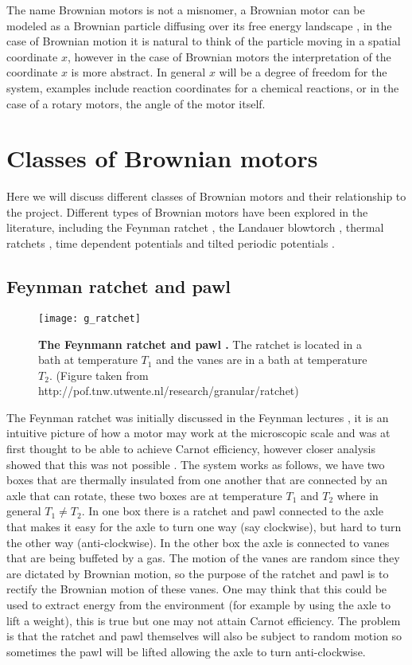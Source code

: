 The name Brownian motors is not a misnomer, a Brownian motor can be modeled as a Brownian particle diffusing over its free energy landscape \cite{Reimann2001}, in the case of Brownian motion it is natural to think of the particle moving in a spatial coordinate $x$, however in the case of Brownian motors the interpretation of the coordinate $x$ is more abstract. In general $x$ will be a degree of freedom for the system, examples include reaction coordinates for a chemical reactions, or in the case of a rotary motors, the angle of the motor itself.

\section{Classes of Brownian motors} \label{BrownianMotorClasses}
Here we will discuss different classes of Brownian motors and their relationship to the project. Different types of Brownian motors have been explored in the literature, including the Feynman ratchet \cite{Feynman1963}, the Landauer blowtorch \cite{Landauer1988}, thermal ratchets \cite{Pedro2014}, time dependent potentials \cite{JoelBader1999,BlickleBechinger2011} and tilted periodic potentials \cite{Leibler1993,Magnasco1994}.

\subsection{Feynman ratchet and pawl}
\begin{figure}
	\center
	\texttt{[image: g\_ratchet]}
	\caption{\textbf{The Feynmann ratchet and pawl \cite{Feynman1963}.} The ratchet is located in a bath at temperature $T_1$ and the vanes are in a bath at temperature $T_2$.  (Figure taken from http://pof.tnw.utwente.nl/research/granular/ratchet) \label{fig:feynmannRatchet}}
\end{figure}
The Feynman ratchet was initially discussed in the Feynman lectures \cite{Feynman1963}, it is an intuitive picture of how a motor may work at the microscopic scale and was at first thought to be able to achieve Carnot efficiency, however closer analysis showed that this was not possible \cite{ParrondoEspanol1996}. The system works as follows, we have two boxes that are thermally insulated from one another that are connected by an axle that can rotate, these two boxes are at temperature $T_1$ and $T_2$ where in general $T_1 \neq T_2$. In one box there is a ratchet and pawl connected to the axle that makes it easy for the axle to turn one way (say clockwise), but hard to turn the other way (anti-clockwise). In the other box the axle is connected to vanes that are being buffeted by a gas. The motion of the vanes are random since they are dictated by Brownian motion, so the purpose of the ratchet and pawl is to rectify the Brownian motion of these vanes. One may think that this could be used to extract energy from the environment (for example by using the axle to lift a weight), this is true but one may not attain Carnot efficiency. The problem is that the ratchet and pawl themselves will also be subject to random motion so sometimes the pawl will be lifted allowing the axle to turn anti-clockwise.

